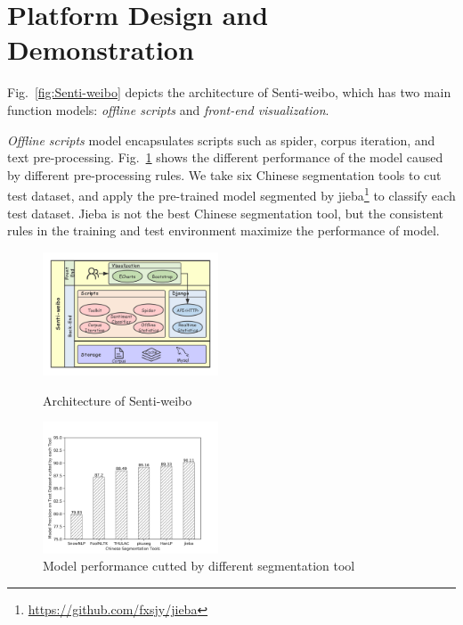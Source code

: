\documentclass[runningheads]{llncs}
\begin{document}
\section{Platform Design and Demonstration}
Fig.~\ref{fig:Senti-weibo} depicts the architecture of Senti-weibo, which has two main function models: \textit{offline scripts} and \textit{front-end visualization}.

\textit{Offline scripts} model encapsulates scripts such as spider, corpus iteration, and text pre-processing. Fig.~\ref{fig:segmentation-tools-precision} shows the different performance of the model caused by different pre-processing rules. We take six Chinese segmentation tools to cut test dataset, and apply the pre-trained model segmented by jieba\footnote{\url{https://github.com/fxsjy/jieba}} to classify each test dataset. Jieba is not the best Chinese segmentation tool, but the consistent rules in the training and test environment maximize the performance of model.

\begin{figure}[htbp]
\vspace{-0.5cm}   %
\centering
\begin{minipage}[t]{0.43\textwidth}
\centering
\includegraphics[width=5.2cm]{images/Architecture-of-Senti-weibo-3.png}
\caption{Architecture of Senti-weibo}
\label{fig:Senti-weibo}
\end{minipage}
\begin{minipage}[t]{0.43\textwidth}
\centering
\includegraphics[width=5.2cm]{images/model-precision-on-test-dataset-cutted-by-each-tool.png}
\caption{Model performance cutted by different segmentation tool}
\label{fig:segmentation-tools-precision}
\end{minipage}
\end{figure}
\end{document}
